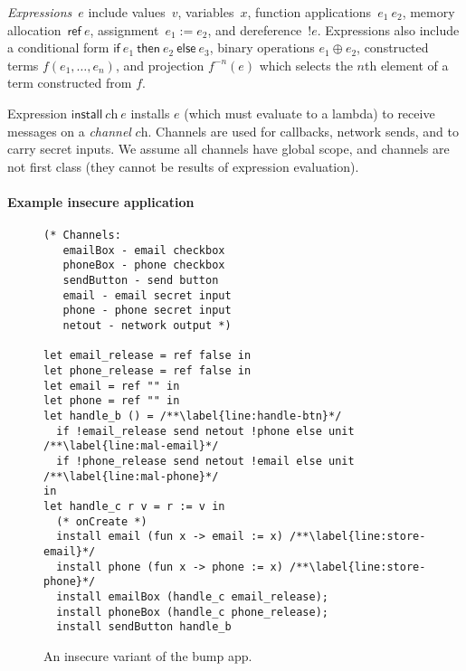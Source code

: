 \documentclass{entcs} \usepackage{entcsmacro}
\newcommand{\sfmt}[1]{\textsf{#1}}
\newcommand{\sch}{\textit{ch}}
\newcommand{\sassign}[2]{#1 := #2}
\newcommand{\sderef}[1]{!#1}
\newcommand{\sif}[3]{\sfmt{if}~#1~\sfmt{then}~#2~\sfmt{else}~#3}
\newcommand{\sinstall}[2]{\sfmt{install}~#1~#2}
\newcommand{\sref}[1]{\sfmt{ref}~#1}
\begin{document}
\emph{Expressions}~$e$ include values~$v$, variables~$x$,
function applications~$e_1~e_2$, memory
allocation~$\sref{e}$, assignment~$\sassign{e_1}{e_2}$, and
dereference~$\sderef{e}$. Expressions also include a conditional form
$\sif{e_1}{e_2}{e_3}$, binary operations $e_1\oplus e_2$, constructed
terms $f(e_1, \ldots, e_n)$, and projection $f^{-n}(e)$ which selects the
$n$th element of a term constructed from $f$.

Expression $\sinstall{\sch}{e}$ installs $e$ (which must evaluate to a
lambda) to receive messages on a \emph{channel} $\sch$. Channels are
used for callbacks, network sends, and to carry secret inputs. We assume
all channels have global scope, and channels are not first class
(they cannot be results of expression evaluation).

\paragraph*{Example insecure application}

\begin{figure}[t!]
  \lstset{language=Caml}
  \begin{lstlisting}[name=Ex]
(* Channels:
   emailBox - email checkbox
   phoneBox - phone checkbox
   sendButton - send button
   email - email secret input
   phone - phone secret input
   netout - network output *)

let email_release = ref false in
let phone_release = ref false in
let email = ref "" in
let phone = ref "" in
let handle_b () = /**\label{line:handle-btn}*/
  if !email_release send netout !phone else unit /**\label{line:mal-email}*/
  if !phone_release send netout !email else unit /**\label{line:mal-phone}*/
in
let handle_c r v = r := v in
  (* onCreate *)
  install email (fun x -> email := x) /**\label{line:store-email}*/
  install phone (fun x -> phone := x) /**\label{line:store-phone}*/
  install emailBox (handle_c email_release);
  install phoneBox (handle_c phone_release);
  install sendButton handle_b
\end{lstlisting}
  \caption{An insecure variant of the bump app.}
  \label{fig:evilappexample}
\end{figure}
\end{document}
